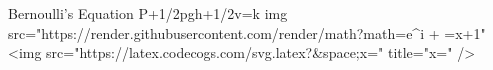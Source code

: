 Bernoulli's Equation
 P+1/2pgh+1/2v=k
img src="https://render.githubusercontent.com/render/math?math=e^{i +\pi} =x+1"
<img src="https://latex.codecogs.com/svg.latex?\Large&space;x=" title="\Large x=" />

